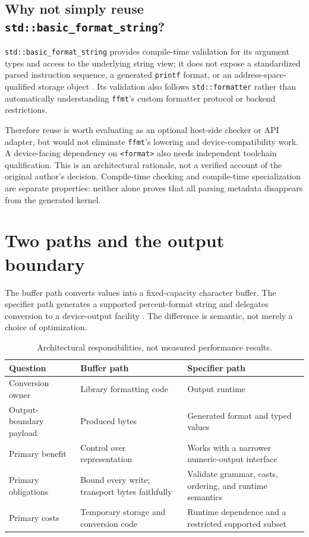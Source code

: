 \documentclass[11pt,letterpaper]{article}
\newcommand{\ffmt}{\texttt{ffmt}}
\begin{document}
\subsection{Why not simply reuse \texttt{std::basic\_format\_string}?}

\texttt{std::basic\_format\_string} provides compile-time validation for its
argument types and access to the underlying string view; it does not expose
a standardized parsed instruction sequence, a generated \texttt{printf}
format, or an address-space-qualified storage object \cite{format-string}.
Its validation also follows \texttt{std::formatter} rather than automatically
understanding \ffmt's custom formatter protocol or backend restrictions.

Therefore reuse is worth evaluating as an optional host-side checker or API
adapter, but would not eliminate \ffmt's lowering and device-compatibility
work. A device-facing dependency on \texttt{<format>} also needs independent
toolchain qualification. This is an architectural rationale, not a verified
account of the original author's decision. Compile-time checking and
compile-time specialization are separate properties: neither alone proves
that all parsing metadata disappears from the generated kernel.

\section{Two paths and the output boundary}

The buffer path converts values into a fixed-capacity character buffer. The
specifier path generates a supported percent-format string and delegates
conversion to a device-output facility \cite{ffmt-readme}. The difference is
semantic, not merely a choice of optimization.

\begin{table}[!htbp]
\centering\small
\begin{tabularx}{\linewidth}{@{}P{2.65cm} Y Y@{}}
\toprule
Question & Buffer path & Specifier path \\
\midrule
Conversion owner & Library formatting code & Output runtime \\
Output-boundary payload & Produced bytes & Generated format and typed values \\
Primary benefit & Control over representation & Works with a narrower numeric-output interface \\
Primary obligations & Bound every write; transport bytes faithfully & Validate grammar, casts, ordering, and runtime semantics \\
Primary costs & Temporary storage and conversion code & Runtime dependence and a restricted supported subset \\
\bottomrule
\end{tabularx}
\caption{Architectural responsibilities, not measured performance results.}
\label{tab:paths}
\end{table}
\end{document}
